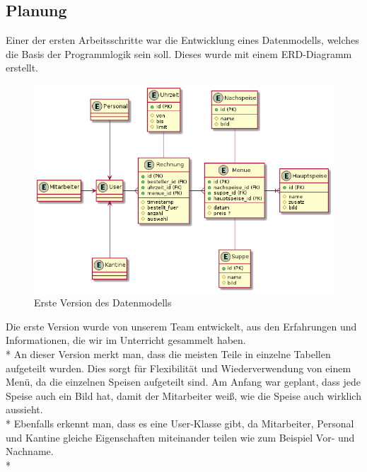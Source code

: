 \subsection{Planung}
\author{Benjamin Besic}
Einer der ersten Arbeitsschritte war die Entwicklung eines Datenmodells, welches die Basis der Programmlogik sein soll. Dieses wurde mit einem ERD-Diagramm erstellt.
\begin{figure}[htp]
    \centering
    \includegraphics[scale=0.4]{pics/erd-alt.png}
    \caption{Erste Version des Datenmodells}
    \label{fig:impl:ERDold}
\end{figure}

Die erste Version wurde von unserem Team entwickelt, aus den Erfahrungen und Informationen, die wir im Unterricht gesammelt haben. \\*
An dieser Version merkt man, dass die meisten Teile in einzelne Tabellen aufgeteilt wurden. Dies sorgt für Flexibilität und Wiederverwendung von einem Menü, da die einzelnen
Speisen aufgeteilt sind.
Am Anfang war geplant, dass jede Speise auch ein Bild hat, damit der Mitarbeiter weiß, wie die Speise auch wirklich aussieht.\\*
Ebenfalls erkennt man, dass es eine User-Klasse gibt, da Mitarbeiter, Personal und Kantine gleiche Eigenschaften miteinander teilen wie zum Beispiel Vor- und Nachname.\\*


